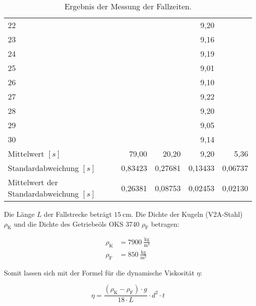 \begin{table}[H]
\begin{tabular}{|l||r|r|r|r|}
                    22 &         &          & 9,20    &     \\
                    23 &         &          & 9,16    &     \\
                    24 &         &          & 9,19    &     \\
                    25 &         &          & 9,01    &     \\
                    26 &         &          & 9,10    &     \\
                    27 &         &          & 9,22    &     \\
                    28 &         &          & 9,20    &     \\
                    29 &         &          & 9,05    &     \\
                    30 &         &          & 9,14    &     \\
                    \hline
                    Mittelwert $[s]$ & 79,00 & 20,20 & 9,20 & 5,36\\
                    Standardabweichung $[s]$ & 0,83423 & 0,27681 & 0,13433 & 0,06737\\
                    Mittelwert der Standardabweichung $[s]$ & 0,26381 & 0,08753 & 0,02453 & 0,02130\\
                    \hline
                \end{tabular}
                \caption{Ergebnis der Messung der Fallzeiten.}
                \label{tab:MesswerteFallzeiten}
            \end{table}

            Die Länge $L$ der Fallstrecke beträgt $15\ \mathrm{cm}$. Die Dichte der Kugeln (V2A-Stahl) $\rho_{\mathrm{K}}$ und die Dichte des Getriebeöls OKS 3740 $\rho_{\mathrm{F}}$ betragen:

            \begin{align}
                \rho_{\mathrm{K}} &= 7900\ \mathrm{\frac{kg}{m^{3}}}\\
                \rho_{\mathrm{F}} &= 850\ \mathrm{\frac{kg}{m^{3}}}
            \end{align}

            Somit lassen sich mit der Formel für die dynamische Viskosität $\eta$:

            \begin{equation}
                \eta = \frac{(\rho_{\mathrm{K}} - \rho_{\mathrm{F}}) \cdot g}{18 \cdot L} \cdot d^{2} \cdot t
            \end{equation}


